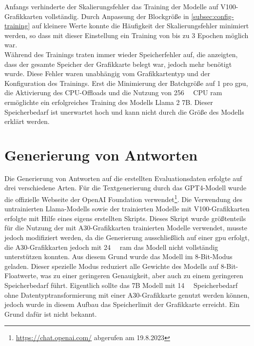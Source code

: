 Anfangs verhinderte der Skalierungsfehler das Training der Modelle auf V100-Grafikkarten vollständig.
Durch Anpassung der Blockgröße in \cref{subsec:config-training} auf kleinere Werte konnte die Häufigkeit der Skalierungsfehler minimiert werden, so dass mit dieser Einstellung ein Training von bis zu 3 Epochen möglich war.\\

Während des Trainings traten immer wieder Speicherfehler auf, die anzeigten, dass der gesamte Speicher der Grafikkarte belegt war, jedoch mehr benötigt wurde.
Diese Fehler waren unabhängig vom Grafikkartentyp und der Konfiguration des Trainings.
Erst die Minimierung der Batchgröße auf 1 pro \ac{gpu}, die Aktivierung des CPU-Offloads und die Nutzung von \SI{256}{\giga\byte} CPU \ac{ram} ermöglichte ein erfolgreiches Training des Modells Llama 2 7B.
Dieser Speicherbedarf ist unerwartet hoch und kann nicht durch die Größe des Modells erklärt werden.

\section{Generierung von Antworten}\label{sec:generierung}
Die Generierung von Antworten auf die erstellten Evaluationsdaten erfolgte auf drei verschiedene Arten.
Für die Textgenerierung durch das GPT4-Modell wurde die offizielle Webseite der OpenAI Foundation verwendet\footnote{\url{https://chat.openai.com/} abgerufen am 19.8.2023}.
Die Verwendung des untrainierten Llama-Modells sowie der trainierten Modelle mit V100-Grafikkarten erfolgte mit Hilfe eines eigens erstellten Skripts.
Dieses Skript wurde größtenteils für die Nutzung der mit A30-Grafikkarten trainierten Modelle verwendet, musste jedoch modifiziert werden, da die Generierung ausschließlich auf einer \ac{gpu} erfolgt, die A30-Grafikkarten jedoch mit \SI{24}{\giga\byte} \ac{ram} das Modell nicht vollständig unterstützen konnten.
Aus diesem Grund wurde das Modell im 8-Bit-Modus geladen. Dieser spezielle Modus reduziert alle Gewichte des Modells auf 8-Bit-Floatwerte, was zu einer geringeren Genauigkeit, aber auch zu einem geringeren Speicherbedarf führt. Eigentlich sollte das 7B Modell mit \SI{14}{\giga\byte} Speicherbedarf ohne Datentyptransformierung mit einer A30-Grafikkarte genutzt werden können, jedoch wurde in diesem Aufbau das Speicherlimit der Grafikkarte erreicht. Ein Grund dafür ist nicht bekannt.\\

